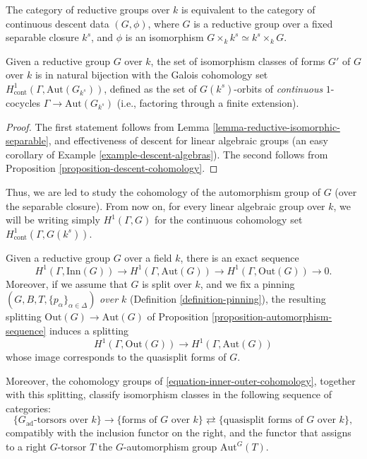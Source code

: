 \begin{proposition}
\label{proposition-forms-by-descent}
 The category of reductive groups over $k$ is equivalent to the category of continuous descent data $(G, \phi)$, where $G$ is a reductive group over a fixed separable closure $k^s$, and $\phi$ is an isomorphism $G\times_k k^s\simeq k^s\times_k G$. 
 
 Given a reductive group $G$ over $k$, the set of isomorphism classes of forms $G'$ of $G$ over $k$ is in natural bijection with the Galois cohomology set $H^1_{\text{cont}}(\Gamma, \text{Aut}(G_{k^s}))$, defined as the set of $G(k^s)$-orbits of \emph{continuous} $1$-cocycles $\Gamma\to \text{Aut}(G_{k^s})$ (i.e., factoring through a finite extension). 
\end{proposition}

\begin{proof}
 The first statement follows from Lemma \ref{lemma-reductive-isomorphic-separable}, and effectiveness of descent for linear algebraic groups (an easy corollary of Example \ref{example-descent-algebras}). The second follows from Proposition \ref{proposition-descent-cohomology}. 
\end{proof}

Thus, we are led to study the cohomology of the automorphism group of $G$ (over the separable closure). From now on, for every linear algebraic group over $k$, we will be writing simply $H^1(\Gamma, G)$ for the continuous cohomology set $H^1_{\text{cont}}(\Gamma, G(k^s))$. 

\begin{proposition}
 \label{proposition-inner-outer-cohomology}
Given a reductive group $G$ over a field $k$, there is an exact sequence
\begin{equation}
\label{equation-inner-outer-cohomology}
 H^1(\Gamma, \text{Inn}(G)) \to H^1(\Gamma, \text{Aut}(G)) \to H^1(\Gamma, \text{Out}(G)) \to 0.
\end{equation}
Moreover, if we assume that $G$ is split over $k$, and we fix a pinning $(G, B, T, \{p_\alpha\}_{\alpha\in\Delta})$ \emph{over $k$} (Definition \ref{definition-pinning}), the resulting splitting $\text{Out}(G)\to \text{Aut}(G)$ of Proposition \ref{proposition-automorphism-sequence} induces a splitting
$$  H^1(\Gamma, \text{Out}(G)) \to H^1(\Gamma, \text{Aut}(G))$$
whose image corresponds to the quasisplit forms of $G$. 

Moreover, the cohomology groups of \eqref{equation-inner-outer-cohomology}, together with this splitting, classify isomorphism classes in the following sequence of categories:
$$ \{\mbox{$G_{\text{ad}}$-torsors over $k$}\} \to \{\mbox{forms of $G$ over $k$}\} \rightleftarrows \{\mbox{quasisplit forms of $G$ over $k$}\},$$
compatibly with the inclusion functor on the right, and the functor that assigns to a right $G$-torsor $T$ the $G$-automorphism group $\text{Aut}^G(T)$.
\end{proposition}


